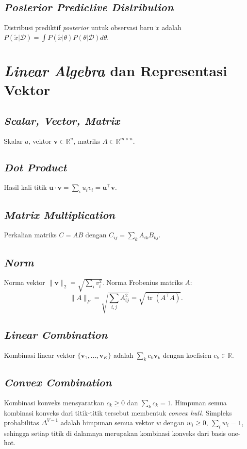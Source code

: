 \subsection{\textit{Posterior Predictive Distribution}}
Distribusi prediktif \textit{posterior} untuk observasi baru \(\tilde{x}\) adalah \(P(\tilde{x}|\mathcal{D}) = \int P(\tilde{x}|\theta) P(\theta|\mathcal{D}) d\theta\).

\section{\textit{Linear Algebra} dan Representasi Vektor}

\subsection{\textit{Scalar, Vector, Matrix}}
Skalar \(a\), vektor \(\mathbf{v} \in \mathbb{R}^n\), matriks \(A \in \mathbb{R}^{m \times n}\).

\subsection{\textit{Dot Product}}
Hasil kali titik \(\mathbf{u} \cdot \mathbf{v} = \sum_i u_i v_i = \mathbf{u}^\top \mathbf{v}\).

\subsection{\textit{Matrix Multiplication}}
Perkalian matriks \(C = AB\) dengan \(C_{ij} = \sum_k A_{ik} B_{kj}\).

\subsection{\textit{Norm}}
Norma vektor \(\|\mathbf{v}\|_2 = \sqrt{\sum_i v_i^2}\). Norma Frobenius matriks \(A\):
\begin{equation}
\|A\|_F = \sqrt{\sum_{i,j} A_{ij}^2} = \sqrt{\operatorname{tr}(A^\top A)}.
\end{equation}

\subsection{\textit{Linear Combination}}
Kombinasi linear vektor \(\{\mathbf{v}_1,\dots,\mathbf{v}_K\}\) adalah \(\sum_k c_k \mathbf{v}_k\) dengan koefisien \(c_k \in \mathbb{R}\).

\subsection{\textit{Convex Combination}}
Kombinasi konveks mensyaratkan \(c_k \ge 0\) dan \(\sum_k c_k = 1\). Himpunan semua kombinasi konveks dari titik-titik tersebut membentuk \textit{convex hull}. Simpleks probabilitas \(\Delta^{V-1}\) adalah himpunan semua vektor \(w\) dengan \(w_i \ge 0,\ \sum_i w_i = 1\), sehingga setiap titik di dalamnya merupakan kombinasi konveks dari basis one-hot.

